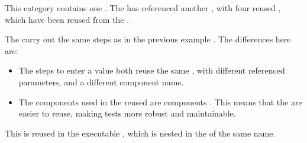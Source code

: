 
This category contains one \gdcase{}. The \gdcase{} has referenced another \gdcase{}, with four reused \gdcases, which have been reused from the \gdproject{} . 

The \gdcases{} carry out the same steps as in the previous example . The differences here are:\\

\begin{itemize}
\item The steps to enter a value both reuse the same \gdcase{}, with different referenced parameters, and a different component name. 
\item The components used in the reused \gdcases{} are  components . This means that the \gdcases{} are easier to reuse, making tests more robust and maintainable. 
\end{itemize}

This \gdcase{} is reused in the executable \gdcase{} , which is nested in the \gdsuite{} of the same name. 




